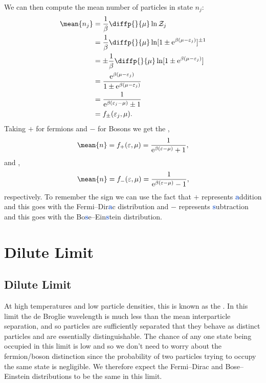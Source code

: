 \documentclass[fleqn]{NotesClass}
\newcommand*{\e}{\mathrm{e}}
\begin{document}
    We can then compute the mean number of particles in state \(n_j\):
    \begin{align}
        \mean{n_j} &= \frac{1}{\beta} \diffp{}{\mu} \ln \mathcal{Z}_j\\
        &= \frac{1}{\beta} \diffp{}{\mu} \ln [1 \pm \e^{\beta(\mu - \varepsilon_j)}]^{\pm 1}\\
        &= \pm \frac{1}{\beta} \diffp{}{\mu} \ln [1 \pm \e^{\beta(\mu - \varepsilon_j)}]\\
        &= \frac{\e^{\beta(\mu - \varepsilon_j)}}{1 \pm \e^{\beta(\mu - \varepsilon_j)}}\\
        &= \frac{1}{\e^{\beta(\varepsilon_j - \mu)} \pm 1}\\
        &= f_{\pm}(\varepsilon_j, \mu).
    \end{align}
    Taking \(+\) for fermions and \(-\) for Bosons we get the ,
    \begin{equation}
        \mean{n} = f_{+}(\varepsilon, \mu) = \frac{1}{\e^{\beta(\varepsilon - \mu)} + 1},
    \end{equation}
    and ,
    \begin{equation}
        \mean{n} = f_{-}(\varepsilon, \mu) = \frac{1}{\e^{\beta(\varepsilon - \mu)} - 1},
    \end{equation}
    respectively.
    To remember the sign we can use the fact that \(+\) represents \textbf{\textcolor{highlight}{a}}ddition and this goes with the Fermi--Dir\textbf{\textcolor{highlight}{a}}c distribution and \(-\) represents \textbf{\textcolor{highlight}{s}}ubtraction and this goes with the Bo\textbf{\textcolor{highlight}{s}}e--Ein\textbf{\textcolor{highlight}{s}}tein distribution.
    
    \chapter{Dilute Limit}
    \section{Dilute Limit}
    At high temperatures and low particle densities, this is known as the .
    In this limit the de Broglie wavelength is much less than the mean interparticle separation, and so particles are sufficiently separated that they behave as distinct particles and are essentially distinguishable.
    The chance of any one state being occupied in this limit is low and so we don't need to worry about the fermion/boson distinction since the probability of two particles trying to occupy the same state is negligible.
    We therefore expect the Fermi--Dirac and Bose--Einstein distributions to be the same in this limit.
    
\end{document}

